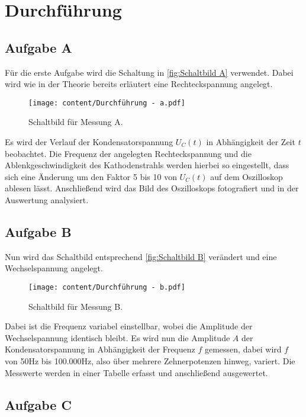 \section{Durchführung}
\label{sec:Durchführung}

\subsection{Aufgabe A}

Für die erste Aufgabe wird die Schaltung in \autoref{fig:Schaltbild A} verwendet.
Dabei wird wie in der Theorie bereits erläutert eine Rechteckspannung angelegt.

\begin{figure}
    \centering
    \texttt{[image: content/Durchführung - a.pdf]}
    \caption{Schaltbild für Messung A. \cite{v353}}
    \label{fig:Schaltbild A}
\end{figure}


Es wird der Verlauf der Kondensatorspannung $U_{C}(t)$ in Abhängigkeit der Zeit $t$ beobachtet.
Die Frequenz der angelegten Rechteckspannung und die Ablenkgeschwindigkeit des Kathodenstrahls werden hierbei so eingestellt,
dass sich eine Änderung um den Faktor 5 bis 10 von $U_{C}(t)$ auf dem Oszilloskop ablesen lässt.
Anschließend wird das Bild des Oszilloskops fotografiert und in der Auswertung analysiert.

\subsection{Aufgabe B}

Nun wird das Schaltbild entsprechend  \autoref{fig:Schaltbild B} verändert und eine Wechselspannung angelegt.

\begin{figure}%
    \centering
    \texttt{[image: content/Durchführung - b.pdf]}
    \caption{Schaltbild für Messung B. \cite{v353}}
    \label{fig:Schaltbild B}
\end{figure}

Dabei ist die Frequenz variabel einstellbar, wobei die Amplitude der Wechselspannung identisch bleibt.
Es wird nun die Amplitude $A$ der Kondensatorspannung in Abhängigkeit der Frequenz $f$ gemessen,
dabei wird $f$ von 50Hz bis 100.000Hz, also über mehrere Zehnerpotenzen hinweg, variert.
Die Messwerte werden in einer Tabelle erfasst und anschließend ausgewertet.

\subsection{Aufgabe C}

